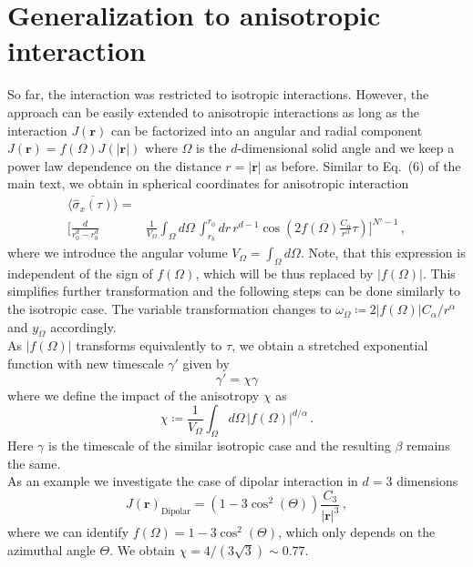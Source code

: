 \documentclass[aps,twocolumn,
superscriptaddress,
footinbib,
prl]{revtex4-1}
\begin{document}
\section{Generalization to anisotropic interaction}
So far, the interaction was restricted to isotropic interactions. However, the approach can be easily extended to anisotropic interactions as long as the interaction $J(\mathbf{r})$ can be factorized into an angular and radial component $J(\mathbf{r}) = f(\Omega) J(|\mathbf{r}|)$ where $\Omega$ is the $d$-dimensional solid angle and we keep a power law dependence on the distance $r = |\mathbf{r}|$ as before. Similar to Eq.~(6) of the main text, we obtain in spherical coordinates for anisotropic interaction
\begin{equation}
\begin{split}
            \overline{\langle \hat{\sigma}_x(\tau) \rangle}  = & \\
            \bigg[ \frac{d}{r_0^d - r_b^d} & \frac{1}{V_\Omega} \int_\Omega d\Omega \, \int_{r_b}^{r_0} dr\, r^{d-1} \cos\left(2 f(\Omega) \frac{ C_\alpha}{r^{\alpha}} \tau\right)\bigg]^{N'-1} \,,
\end{split}
\end{equation}
where we introduce the angular volume $V_\Omega = \int_\Omega d\Omega$. Note, that this expression is independent of the sign of $f(\Omega)$, which will be thus replaced by $|f(\Omega)|$. This simplifies further transformation and the following steps can be done similarly to the isotropic case. The variable transformation changes to $\omega_\Omega \coloneqq 2 |f(\Omega)| C_\alpha/r^\alpha$ and $y_\Omega$ accordingly.\\
As $|f(\Omega)|$ transforms equivalently to $\tau$, we obtain 
a stretched exponential function with new timescale $\gamma'$ given by 
\begin{equation}
    \gamma'=\chi \gamma
\end{equation}
where we define the impact of the anisotropy $\chi$ as 
\begin{equation}
    \chi \coloneqq \frac{1}{V_\Omega}  \int_\Omega d\Omega \, |f(\Omega)|^{d/\alpha} \, .
\end{equation}
Here $\gamma$ is the timescale of the similar isotropic  case and the resulting $\beta$ remains the same. \\
As an example we investigate the case of dipolar interaction in $d=3$ dimensions
\begin{equation}
    \label{dipolar}
    J(\mathbf{r})_{\mathrm{Dipolar}} = (1-3\cos^2(\Theta)) \frac{C_3}{|\mathbf{r}|^3} \, ,
\end{equation}
where we can identify $f(\Omega) = 1-3\cos^2(\Theta)$, which only depends on the azimuthal angle $\Theta$. We obtain $\chi = 4/(3\sqrt{3}) \sim 0.77$. \\
\end{document}
